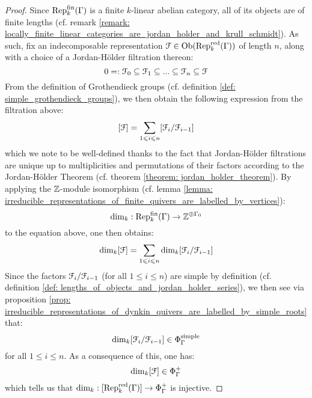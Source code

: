                 \begin{proof}
                    Since $\mathrm{Rep}_k^{\mathrm{fin}}(\Gamma)$ is a finite $k$-linear abelian category, all of its objects are of finite lengths (cf. remark \ref{remark: locally_finite_linear_categories_are_jordan_holder_and_krull_schmidt}). As such, fix an indecomposable representation $\mathcal{F} \in \mathrm{Ob}(\mathrm{Rep}_k^{\mathrm{red}}(\Gamma))$ of length $n$, along with a choice of a Jordan-H\"older filtration thereon:
                        $$0 =: \mathcal{F}_0 \subseteq \mathcal{F}_1 \subseteq ... \subseteq \mathcal{F}_n \subseteq \mathcal{F}$$
                    From the definition of Grothendieck groups (cf. definition \ref{def: simple_grothendieck_groups}), we then obtain the following expression from the filtration above:
                        $$[\mathcal{F}] = \sum_{1 \leqslant i \leqslant n} [\mathcal{F}_i/\mathcal{F}_{i - 1}]$$
                    which we note to be well-defined thanks to the fact that Jordan-H\"older filtrations are unique up to multiplicities and permutations of their factors according to the Jordan-H\"older Theorem (cf. theorem \ref{theorem: jordan_holder_theorem}). By applying the $\mathbb{Z}$-module isomorphism (cf. lemma \ref{lemma: irreducible_representations_of_finite_quivers_are_labelled_by_vertices}):
                        $$\dim_k: \mathrm{Rep}_k^{\mathrm{fin}}(\Gamma) \to \mathbb{Z}^{\oplus \Gamma_0}$$
                    to the equation above, one then obtains:
                        $$\dim_k [\mathcal{F}] = \sum_{1 \leqslant i \leqslant n} \dim_k [\mathcal{F}_i/\mathcal{F}_{i - 1}]$$
                    Since the factors $\mathcal{F}_i/\mathcal{F}_{i - 1}$ (for all $1 \leq i \leq n$) are simple by definition (cf. definition \ref{def: lengths_of_objects_and_jordan_holder_series}), we then see via proposition \ref{prop: irreducible_representations_of_dynkin_quivers_are_labelled_by_simple_roots} that:
                        $$\dim_k [\mathcal{F}_i/\mathcal{F}_{i - 1}] \in \Phi_{\Gamma}^{\mathrm{simple}}$$
                    for all $1 \leq i \leq n$. As a consequence of this, one has:
                        $$\dim_k [\mathcal{F}] \in \Phi_{\Gamma}^+$$
                    which tells us that $\dim_k: [\mathrm{Rep}_k^{\mathrm{red}}(\Gamma)] \to \Phi_{\Gamma}^+$ is injective.
                    

\end{proof}
